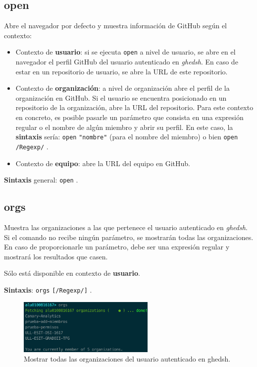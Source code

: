 \subsection{open}
\label{3.3.13}

Abre el navegador por defecto y muestra información de GitHub según el contexto:
\begin{itemize}
	\item Contexto de \textbf{usuario}: si se ejecuta \verb|open| a nivel de usuario, se abre en el navegador el perfil GitHub del usuario autenticado en {\it ghedsh}. En caso de estar en un repositorio de usuario, se abre la URL de este repositorio.
	\item Contexto de \textbf{organización}: a nivel de organización abre el perfil de la organización en GitHub. Si el usuario se encuentra posicionado en un repositorio de la organización, abre la URL del repositorio.
	Para este contexto en concreto, es posible pasarle un parámetro que consista en una expresión regular o el nombre de algún miembro y abrir su perfil.
	En este caso, la \textbf{sintaxis} sería: \verb|open| \verb|"nombre"| (para el nombre del miembro) o bien \verb|open| \verb|/Regexp/| .
	\item Contexto de \textbf{equipo}: abre la URL del equipo en GitHub.
\end{itemize}

\textbf{Sintaxis} general: \verb|open| .

\subsection{orgs}
\label{3.3.14}

Muestra las organizaciones a las que pertenece el usuario autenticado en {\it ghedsh}. Si el comando no recibe ningún parámetro, se mostrarán todas las organizaciones. En caso de proporcionarle un parámetro, debe ser una expresión regular y mostrará los resultados que casen.

Sólo está disponible en contexto de \textbf{usuario}.

\textbf{Sintaxis}: \verb|orgs| \verb|[/Regexp/]| .

\begin{figure}[H]
	\begin{center}
	\includegraphics[width=0.59\textwidth]{images/show-all-orgs.png}
	\caption{Mostrar todas las organizaciones del usuario autenticado en ghedsh.}
	\label{fig:show-orgs-regexp}
	\end{center}
\end{figure}

